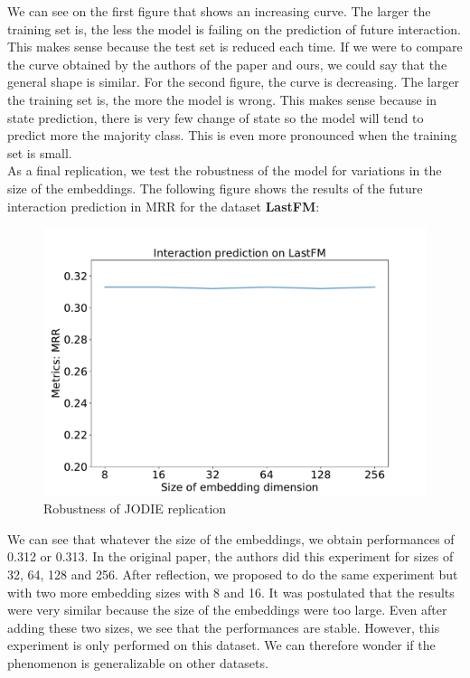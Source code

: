 We can see on the first figure that shows an increasing curve. The larger the training set is, the less the model is failing on the prediction of future interaction. This makes sense because the test set is reduced each time. If we were to compare the curve obtained by the authors of the paper and ours, we could say that the general shape is similar.
For the second figure, the curve is decreasing. The larger the training set is, the more the model is wrong. This makes sense because in state prediction, there is very few change of state so the model will tend to predict more the majority class. This is even more pronounced when the training set is small.\\

As a final replication, we test the robustness of the model for variations in the size of the embeddings. The following figure shows the results of the future interaction prediction in MRR for the dataset \textbf{LastFM}: 
\begin{figure}[H]
    \centering
    \includegraphics[scale = 0.35]{image/lastfm.pdf}
    \caption{Robustness of JODIE replication}
\end{figure}
We can see that whatever the size of the embeddings, we obtain performances of 0.312 or 0.313. In the original paper, the authors did this experiment for sizes of 32, 64, 128 and 256. After reflection, we proposed to do the same experiment but with two more embedding sizes with 8 and 16. It was postulated that the results were very similar because the size of the embeddings were too large. Even after adding these two sizes, we see that the performances are stable. However, this experiment is only performed on this dataset. We can therefore wonder if the phenomenon is generalizable on other datasets.


